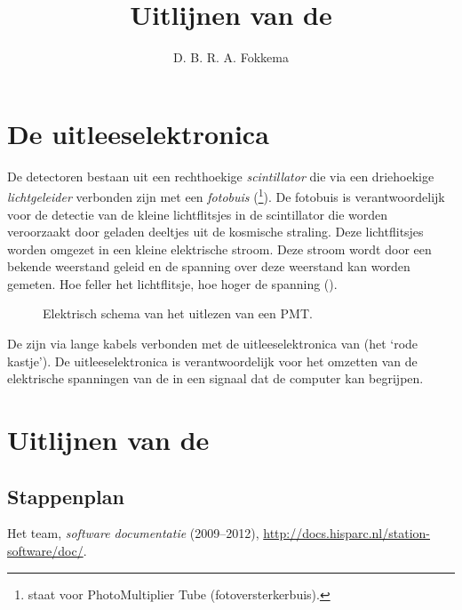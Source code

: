 



\title{Uitlijnen van de \adcs}
\author{D. B. R. A. Fokkema}
\date{}

\maketitle

\section{De \hisparc uitleeselektronica}

De \hisparc detectoren bestaan uit een rechthoekige \emph{scintillator}
die via een driehoekige \emph{lichtgeleider} verbonden zijn met een
\emph{fotobuis} (\pmt \footnote{\pmt staat voor PhotoMultiplier Tube
(fotoversterkerbuis).}).  De fotobuis is verantwoordelijk voor de detectie
van de kleine lichtflitsjes in de scintillator die worden veroorzaakt door
geladen deeltjes uit de kosmische straling.  Deze lichtflitsjes worden
omgezet in een kleine elektrische stroom.  Deze stroom wordt door een
bekende weerstand geleid en de spanning over deze weerstand kan worden
gemeten.  Hoe feller het lichtflitsje, hoe hoger de spanning
().

\begin{figure}
\centering
{}
\caption{Elektrisch schema van het uitlezen van een PMT.}
\label{fig:schema-pmt}
\end{figure}

De \pmts zijn via lange kabels verbonden met de uitleeselektronica van
\hisparc (het `rode kastje').  De uitleeselektronica is verantwoordelijk
voor het omzetten van de elektrische spanningen van de \pmts in een
signaal dat de computer kan begrijpen.

\section{Uitlijnen van de \adcs}

\subsection{Stappenplan}


\begin{thebibliography}{9}
 Het \hisparc team, \emph{\hisparc software
documentatie} (2009--2012),
\url{http://docs.hisparc.nl/station-software/doc/}.
\end{thebibliography}


